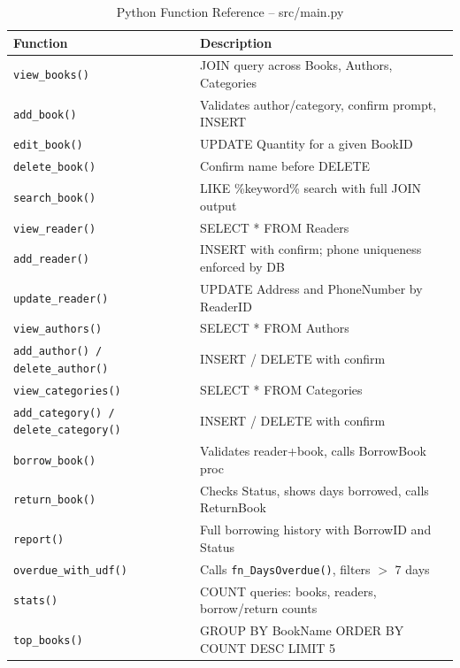 \documentclass[12pt,a4paper,oneside]{report}
\begin{document}
\begin{table}[H]
  \centering
  \caption{Python Function Reference -- src/main.py}
  \begin{tabularx}{\linewidth}{L{4.5cm} X}
    \toprule
    \textbf{Function} & \textbf{Description} \\
    \midrule
    \texttt{view\_books()}                        & JOIN query across Books, Authors, Categories \\
    \texttt{add\_book()}                          & Validates author/category, confirm prompt, INSERT \\
    \texttt{edit\_book()}                         & UPDATE Quantity for a given BookID \\
    \texttt{delete\_book()}                       & Confirm name before DELETE \\
    \texttt{search\_book()}                       & LIKE \%keyword\% search with full JOIN output \\
    \texttt{view\_reader()}                       & SELECT * FROM Readers \\
    \texttt{add\_reader()}                        & INSERT with confirm; phone uniqueness enforced by DB \\
    \texttt{update\_reader()}                     & UPDATE Address and PhoneNumber by ReaderID \\
    \texttt{view\_authors()}                      & SELECT * FROM Authors \\
    \texttt{add\_author() / delete\_author()}     & INSERT / DELETE with confirm \\
    \texttt{view\_categories()}                   & SELECT * FROM Categories \\
    \texttt{add\_category() / delete\_category()} & INSERT / DELETE with confirm \\
    \texttt{borrow\_book()}                       & Validates reader+book, calls BorrowBook proc \\
    \texttt{return\_book()}                       & Checks Status, shows days borrowed, calls ReturnBook \\
    \texttt{report()}                             & Full borrowing history with BorrowID and Status \\
    \texttt{overdue\_with\_udf()}                 & Calls \texttt{fn\_DaysOverdue()}, filters $>$ 7 days \\
    \texttt{stats()}                              & COUNT queries: books, readers, borrow/return counts \\
    \texttt{top\_books()}                         & GROUP BY BookName ORDER BY COUNT DESC LIMIT 5 \\
    \bottomrule
  \end{tabularx}
\end{table}
\end{document}
